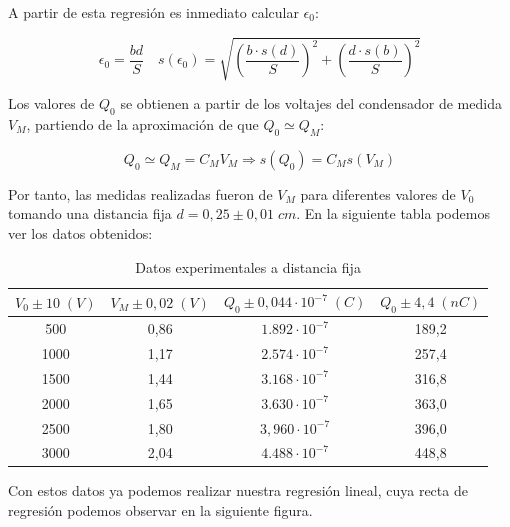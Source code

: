 \documentclass[a4paper,12pt,titlepage]{article}
\begin{document}
A partir de esta regresión es inmediato calcular $\epsilon_0$:

\begin{equation}
    \epsilon_0 = \frac{bd}{S} \quad s(\epsilon_0) = \sqrt{\left( \frac{b\cdot s(d)}{S}\right)^2 + \left( \frac{d\cdot s(b)}{S}\right)^2}
    \label{d_fija}
\end{equation}

Los valores de $Q_0$ se obtienen a partir de los voltajes del condensador de medida $V_M$, partiendo de la aproximación de que $Q_0 \simeq Q_M$:

\begin{equation}
    Q_0 \simeq Q_M = C_M V_M \Rightarrow s(Q_0) = C_M s(V_M)
\end{equation}

Por tanto, las medidas realizadas fueron de $V_M$ para diferentes valores de $V_0$ tomando una distancia fija $d=0,25 \pm 0,01 \;cm$. En la siguiente tabla podemos ver los datos obtenidos:

\begin{table}[h!]
\centering
\begin{tabular}{|c|c|c|c|}
\hline
$V_0\pm 10 \;(V)$ & $V_M \pm 0,02 \;(V)$ & $Q_0 \pm 0,044\cdot 10^{-7}\;(C)$ & $Q_0 \pm 4,4\;(nC)$ \\ \hline
500               & 0,86                 & $1.892 \cdot 10^{-7}$ & 189,2 \\ \hline
1000              & 1,17                 & $2.574\cdot 10^{-7}$   & 257,4 \\ \hline
1500              & 1,44                 & $3.168 \cdot 10^{-7}$   & 316,8 \\ \hline
2000              & 1,65                 & 3$.630 \cdot 10^{-7}$ & 363,0 \\ \hline
2500              & 1,80                  & $3,960 \cdot 10^{-7}$ & 396,0 \\ \hline
3000              & 2,04                 & $4.488 \cdot 10^{-7}$   & 448,8\\ \hline
\end{tabular}
\caption{Datos experimentales a distancia fija}
\label{tab:my-table}
\end{table}

Con estos datos ya podemos realizar nuestra regresión lineal, cuya recta de regresión podemos observar en la siguiente figura.
\end{document}
